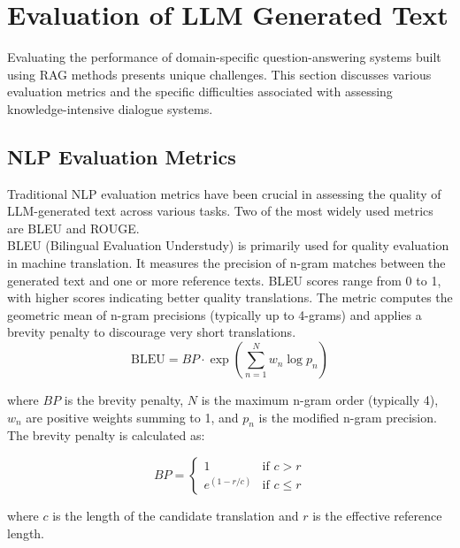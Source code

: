 \section{Evaluation of LLM Generated Text}

Evaluating the performance of domain-specific question-answering systems built using RAG methods presents unique challenges. This section discusses various evaluation metrics and the specific difficulties associated with assessing knowledge-intensive dialogue systems.

\subsection{NLP Evaluation Metrics}

Traditional NLP evaluation metrics have been crucial in assessing the quality of LLM-generated text across various tasks. Two of the most widely used metrics are BLEU and ROUGE.\\

BLEU (Bilingual Evaluation Understudy) \cite{papieni_bleu} is primarily used for quality evaluation in machine translation. It measures the precision of n-gram matches between the generated text and one or more reference texts. BLEU scores range from 0 to 1, with higher scores indicating better quality translations. The metric computes the geometric mean of n-gram precisions (typically up to 4-grams) and applies a brevity penalty to discourage very short translations. \\


\begin{equation}
    \text{BLEU} = BP \cdot \exp\left(\sum_{n=1}^N w_n \log p_n\right)
\end{equation}

\noindent where $BP$ is the brevity penalty, $N$ is the maximum n-gram order (typically 4), $w_n$ are positive weights summing to 1, and $p_n$ is the modified n-gram precision. The brevity penalty is calculated as:

\begin{equation}
    BP = 
    \begin{cases}
        1 & \text{if } c > r \\
        e^{(1-r/c)} & \text{if } c \leq r
    \end{cases}
\end{equation}

\noindent where $c$ is the length of the candidate translation and $r$ is the effective reference length.\\

